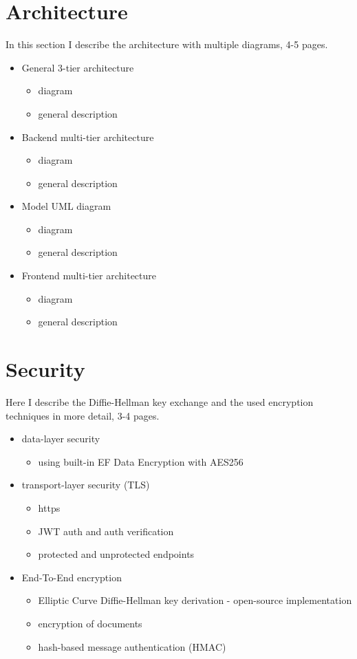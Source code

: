 \section{Architecture}
In this section I describe the architecture with multiple diagrams, 4-5 pages.

\begin{itemize}
	\item General 3-tier architecture
	\begin{itemize}
		\item diagram
		\item general description
	\end{itemize}
	\item Backend multi-tier architecture
	\begin{itemize}
		\item diagram
		\item general description
	\end{itemize}
	\item Model UML diagram
	\begin{itemize}
		\item diagram
		\item general description
	\end{itemize}
	\item Frontend multi-tier architecture
	\begin{itemize}
		\item diagram
		\item general description
	\end{itemize}
\end{itemize}

\section{Security}
Here I describe the Diffie-Hellman key exchange and the used encryption techniques in more detail, 3-4 pages.

\begin{itemize}
	\item data-layer security
	\begin{itemize}
		\item using built-in EF Data Encryption with AES256
	\end{itemize}
	\item transport-layer security (TLS)
	\begin{itemize}
		\item https
		\item JWT auth and auth verification
		\item protected and unprotected endpoints
	\end{itemize}
	\item End-To-End encryption
	\begin{itemize}
		\item Elliptic Curve Diffie-Hellman key derivation - open-source implementation
		\item encryption of documents
		\item hash-based message authentication (HMAC)
	\end{itemize}
\end{itemize}